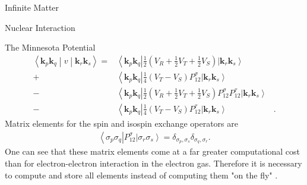 \documentclass[twoside,english]{uiofysmaster}
\begin{document}
\begin{chapter}{Infinite Matter}
\begin{section}{Nuclear Interaction}
\begin{subsection}{The Minnesota Potential}
			\begin{align}
				\left<\mathbf{k}_p \mathbf{k}_q \middle| v \middle| \mathbf{k}_r \mathbf{k}_s \right> = 
				&\left<\mathbf{k}_p \mathbf{k}_q \right| \frac{1}{2} \left( V_R + \frac{1}{2} V_T + \frac{1}{2} V_S \right) \left| \mathbf{k}_r \mathbf{k}_s \right>   \\
				+&\left<\mathbf{k}_p \mathbf{k}_q \right| \frac{1}{4} (V_T - V_S) P_{12}^\sigma \left| \mathbf{k}_r \mathbf{k}_s \right> \nonumber \\
				-&\left<\mathbf{k}_p \mathbf{k}_q \right| \frac{1}{2} \left( V_R + \frac{1}{2} V_T + \frac{1}{2} V_S \right) P_{12}^\sigma P_{12}^\tau \left| \mathbf{k}_r \mathbf{k}_s \right> \nonumber \\
				-&\left<\mathbf{k}_p \mathbf{k}_q \right| \frac{1}{4}(V_T - V_S) P_{12}^\tau  \left| \mathbf{k}_r \mathbf{k}_s \right>&. \nonumber
			\end{align}
			Matrix elements for the spin and isospin exchange operators are 
			\begin{align}
				\left< \sigma_p \sigma_q \right| P_{12}^\sigma \left| \sigma_r \sigma_s \right> = \delta_{\sigma_p,\sigma_s} \delta_{\sigma_q,\sigma_r}.
			\end{align}
			One can see that these matrix elements come at a far greater computational cost than for electron-electron interaction in the electron gas. Therefore it is necessary to compute and store all elements instead of computing them "on the fly" \cite{MHJonline}. 
		\end{subsection}
		
	\end{section}

\end{chapter}
\end{document}
